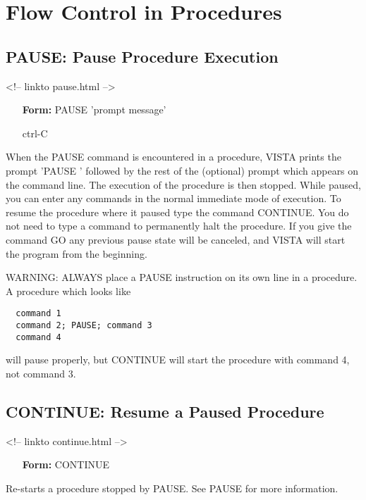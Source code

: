 \chapter{Flow Control in Procedures}


\section{PAUSE: Pause Procedure Execution}
\begin{rawhtml}
<!-- linkto pause.html -->
\end{rawhtml}

\begin{itemize}
\item[\textbf{Form: } PAUSE 'prompt message'\hfill]{}
\item[ctrl-C\hfill]{}
\end{itemize}

When the PAUSE command is encountered in a procedure, VISTA prints the
prompt 'PAUSE ' followed by the rest of the (optional) prompt which appears
on the command line.  The execution of the procedure is then stopped.
While paused, you can enter any commands in the normal immediate mode of
execution.  To resume the procedure where it paused type the command
CONTINUE.  You do not need to type a command to permanently halt the
procedure.  If you give the command GO any previous pause state will be
canceled, and VISTA will start the program from the beginning.

WARNING: ALWAYS place a PAUSE instruction on its own line in a procedure.
A procedure which looks like
\begin{verbatim}
  command 1
  command 2; PAUSE; command 3
  command 4
\end{verbatim}
will pause properly, but CONTINUE will start the procedure with 
command 4, not command 3.

\section{CONTINUE: Resume a Paused Procedure}
\begin{rawhtml}
<!-- linkto continue.html -->
\end{rawhtml}

\begin{itemize}
  \item[\textbf{Form: } CONTINUE\hfill]{}
\end{itemize}
Re-starts a procedure stopped by PAUSE. See PAUSE for more
information. 

